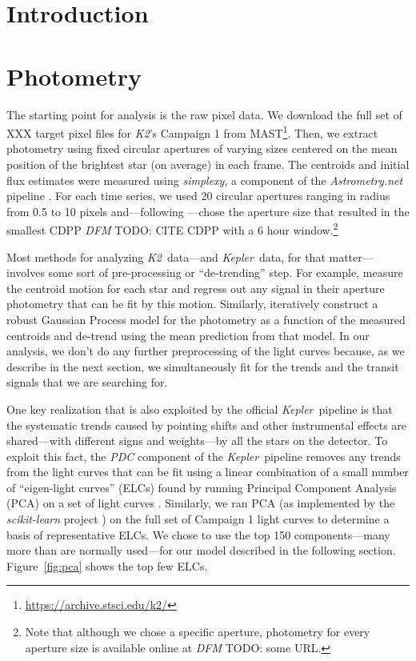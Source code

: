 \documentclass[12pt,preprint]{aastex}
\newcommand{\project}[1]{\emph{#1}}
\newcommand{\kepler}{\project{Kepler}}
\newcommand{\KT}{\project{K2}}
\newcommand{\figref}[1]{\ref{fig:#1}}
\newcommand{\Fig}[1]{Figure~\figref{#1}}
\newcommand{\todo}[3]{{\color{#2} \emph{#1} TODO: #3}}
\newcommand{\dfmtodo}[1]{\todo{DFM}{red}{#1}}
\begin{document}

\section{Introduction}

\section{Photometry}

The starting point for analysis is the raw pixel data.
We download the full set of XXX target pixel files for \KT's Campaign 1 from
MAST\footnote{\url{https://archive.stsci.edu/k2/}}.
Then, we extract photometry using fixed circular apertures of varying sizes
centered on the mean position of the brightest star (on average) in each
frame.
The centroids and initial flux estimates were measured using
\project{simplexy}, a component of the \project{Astrometry.net} pipeline
\citep{astrometry}.
For each time series, we used 20 circular apertures ranging in radius from 0.5
to 10 pixels and---following \citet{vanderberg-a}---chose the aperture size
that resulted in the smallest CDPP \dfmtodo{CITE CDPP} with a 6 hour
window.\footnote{Note that although we chose a specific aperture, photometry
for every aperture size is available online at \dfmtodo{some URL}.}

Most methods for analyzing \KT\ data---and \kepler\ data, for that
matter---involves some sort of pre-processing or ``de-trending'' step.
For example, \citet{vanderberg-a} measure the centroid motion for each star
and regress out any signal in their aperture photometry that can be fit by
this motion.
Similarly, \citet{crossfield} iteratively construct a robust Gaussian Process
model for the photometry as a function of the measured centroids and de-trend
using the mean prediction from that model.
In our analysis, we don't do any further preprocessing of the light curves
because, as we describe in the next section, we simultaneously fit for the
trends and the transit signals that we are searching for.

One key realization that is also exploited by the official \kepler\ pipeline
is that the systematic trends caused by pointing shifts and other instrumental
effects are shared---with different signs and weights---by all the stars on
the detector.
To exploit this fact, the \project{PDC} component of the \kepler\ pipeline
removes any trends from the light curves that can be fit using a linear
combination of a small number of ``eigen-light curves'' (ELCs) found by
running Principal Component Analysis (PCA) on a set of light curves
\citep{map-pdc1, map-pdc2}.
Similarly, we ran PCA (as implemented by the \project{scikit-learn} project
\citealt{sklearn}) on the full set of Campaign 1 light curves to determine a
basis of representative ELCs.
We chose to use the top 150 components---many more than are normally
used---for our model described in the following section.
\Fig{pca} shows the top few ELCs.
\end{document}
